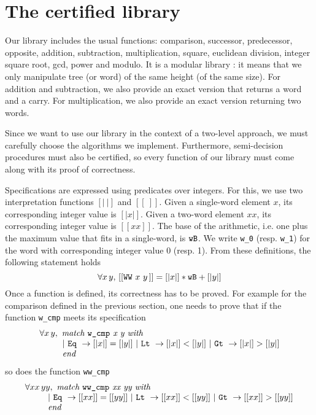 \section{The certified library \label{Op}}
Our library includes the usual functions:
comparison, successor, predecessor, opposite, addition, subtraction,
multiplication, square, euclidean division, integer square root, gcd, 
power and modulo.
It is a modular library : it means that we only manipulate tree (or word)
of the same height (of the same size). 
For addition and subtraction, we also provide an exact version
that returns a word and a carry.
For multiplication, we also provide an exact version
returning two words. 

Since we want to use our library in the context of a two-level approach,
we must carefully choose the algorithms we implement.
Furthermore, semi-decision procedures must also be certified, 
so every function of our library must come along with its proof 
of correctness. 

Specifications are expressed using predicates over integers. For this, 
we use two interpretation functions
{$ [|\ |]$} and {$[[\ ]]$}.
Given a single-word element $x$, its corresponding integer value
is $[|x|]$. Given a two-word element $xx$, its corresponding
integer value is $[[xx]]$. The base of the arithmetic, i.e.
one plus the maximum value that fits in a single-word, is ${\texttt{wB}}$. 
We write {\tt w\_0} (resp. {\tt w\_1}) for the word with 
corresponding integer value 0 (resp. 1).
From these definitions, the following statement holds
$$\forall x\, y,\, [[\texttt{WW}\,\,x\,\,y\,]] = [|x|] * {\texttt{wB}} + [|y|]$$
Once a function is defined, its correctness has to be proved.
For example for the comparison defined in the previous section,
one needs to prove that if the function {\tt w\_cmp} meets its specification
$$\begin{array}{l}
\forall x\, y, \,\, \textit{match {\tt w\_cmp} x y with} \\
\qquad\,\,\,\,
 |\,\, \texttt{Eq}\,\, \rightarrow [|x|] = [|y|]\,\, | \,\,\texttt{Lt}\,\, \rightarrow [|x|] < [|y|] \,\,
| \,\,\texttt{Gt}\,\, \rightarrow [|x|] > [|y|]\\
\qquad\,\,\,\, \textit{end}
\end{array}
$$
so does the function {\tt ww\_cmp}
$$\begin{array}{l}
\forall xx\, yy, \,\, \textit{match {\tt ww\_cmp} xx yy with} \\
\qquad\,\,\,\,
 |\,\, \texttt{Eq}\,\, \rightarrow [[xx]] = [[yy]]\,\, | \,\,\texttt{Lt}\,\, \rightarrow [[xx]] < [[yy]] \,\,
| \,\,\texttt{Gt}\,\, \rightarrow [[xx]] > [[yy]]\\
\qquad\,\,\,\, \textit{end}
\end{array}
$$

